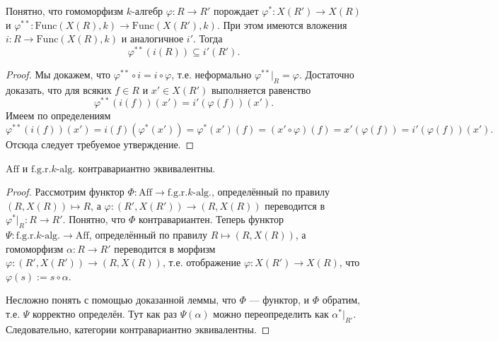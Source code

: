 \documentclass[12pt,a4paper]{article}
\newcommand{\Func}{\mathrm{Func}}
\newcommand{\Aff}{\mathrm{Aff}}
\newcommand{\fgrkalg}[1][k]{\text{f.g.r.$#1$-alg.}}
\begin{document}
    \begin{lemma}
        Понятно, что гомоморфизм $k$-алгебр $\varphi: R \to R'$ порождает $\varphi^*: X(R') \to X(R)$ и $\varphi^{**}: \Func(X(R), k) \to \Func(X(R'), k)$. При этом имеются вложения $i: R \to \Func(X(R), k)$ и аналогичное $i'$. Тогда
        \[\varphi^{**}(i(R)) \subseteq i'(R').\]
    \end{lemma}

    \begin{proof}
        Мы докажем, что $\varphi^{**} \circ i = i \circ \varphi$, т.е. неформально $\varphi^{**}|_R = \varphi$. Достаточно доказать, что для всяких $f \in R$ и $x' \in X(R')$ выполняется равенство
        \[\varphi^{**}(i(f))(x') = i'(\varphi(f))(x').\]
        Имеем по определениям
        \[\varphi^{**}(i(f))(x') = i(f)(\varphi^*(x')) = \varphi^*(x')(f) = (x' \circ \varphi)(f) = x'(\varphi(f)) = i'(\varphi(f))(x').\]
        Отсюда следует требуемое утверждение.
    \end{proof}

    \begin{theorem}
        $\Aff$ и $\fgrkalg$ контравариантно эквивалентны.
    \end{theorem}

    \begin{proof}
        Рассмотрим функтор $\Phi: \Aff \to \fgrkalg$, определённый по правилу $(R, X(R)) \mapsto R$, а $\varphi: (R', X(R')) \to (R, X(R))$ переводится в $\varphi^*|_R: R \to R'$. Понятно, что $\Phi$ контравариантен. Теперь функтор $\Psi: \fgrkalg \to \Aff$, определённый по правилу $R \mapsto (R, X(R))$, а гомоморфизм $\alpha: R \to R'$ переводится в морфизм $\varphi: (R', X(R')) \to (R, X(R))$, т.е. отображение $\varphi: X(R') \to X(R)$, что $\varphi(s) := s \circ \alpha$.

        Несложно понять с помощью доказанной леммы, что $\Phi$ --- функтор, и $\Phi$ обратим, т.е. $\Psi$ корректно определён. Тут как раз $\Psi(\alpha)$ можно переопределить как $\alpha^*|_{R'}$. Следовательно, категории контравариантно эквивалентны.
    \end{proof}
\end{document}
